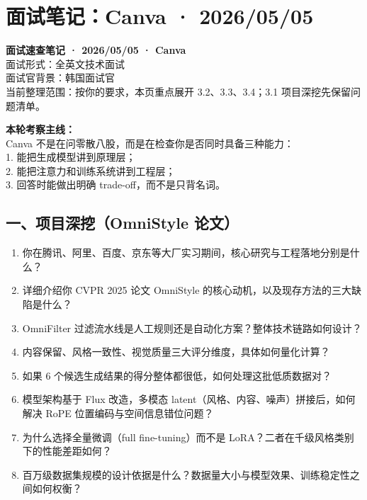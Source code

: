 
\section{面试笔记：Canva · 2026/05/05}

\begin{conceptbox}
\textbf{面试速查笔记 · 2026/05/05 · Canva}\\
面试形式：全英文技术面试\\
面试官背景：韩国面试官\\
当前整理范围：按你的要求，本页重点展开 3.2、3.3、3.4；3.1 项目深挖先保留问题清单。
\end{conceptbox}

\begin{warnbox}
\textbf{本轮考察主线：}\\
Canva 不是在问零散八股，而是在检查你是否同时具备三种能力：\\
1. 能把生成模型讲到原理层；\\
2. 能把注意力和训练系统讲到工程层；\\
3. 回答时能做出明确 trade-off，而不是只背名词。
\end{warnbox}

\subsection{一、项目深挖（OmniStyle 论文）}

\begin{enumerate}[leftmargin=1.5em]
  \item 你在腾讯、阿里、百度、京东等大厂实习期间，核心研究与工程落地分别是什么？
  \item 详细介绍你 CVPR 2025 论文 OmniStyle 的核心动机，以及现存方法的三大缺陷是什么？
  \item OmniFilter 过滤流水线是人工规则还是自动化方案？整体技术链路如何设计？
  \item 内容保留、风格一致性、视觉质量三大评分维度，具体如何量化计算？
  \item 如果 6 个候选生成结果的得分整体都很低，如何处理这批低质数据对？
  \item 模型架构基于 Flux 改造，多模态 latent（风格、内容、噪声）拼接后，如何解决 RoPE 位置编码与空间信息错位问题？
  \item 为什么选择全量微调（full fine-tuning）而不是 LoRA？二者在千级风格类别下的性能差距如何？
  \item 百万级数据集规模的设计依据是什么？数据量大小与模型效果、训练稳定性之间如何权衡？
\end{enumerate}

